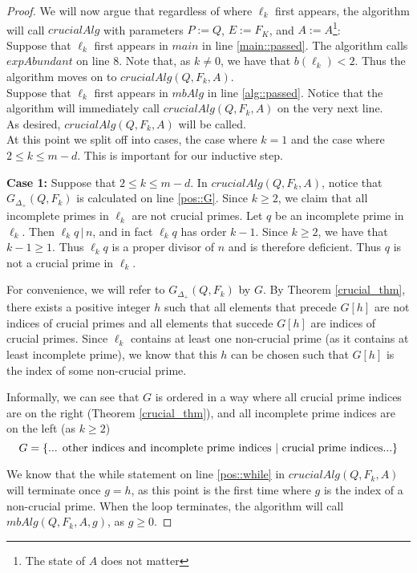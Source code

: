 \documentclass[../paper.tex]{subfiles}
\begin{document}
\begin{proof}
  We will now argue that regardless of where $\ell_k$ first
appears, the algorithm will call $crucialAlg$ with
parameters $P:= Q$, $E := F_K$, and $A := A$\footnote{The state of
$A$ does not matter}:
\\

Suppose that $\ell_k$ first appears in $main$ in line
\ref{main::passed}. The algorithm calls $expAbundant$ on 
line 8. Note that, 
as $k \neq 0$, we have that $b(\ell_k) < 2$. Thus the algorithm 
moves on to $crucialAlg(Q, F_k, A)$.
\\

Suppose that $\ell_k$ first appears in $mbAlg$ in line
\ref{alg::passed}. Notice that
the algorithm will immediately call $crucialAlg(Q, F_k, A)$ on the
very next line.
\\

As desired, $crucialAlg(Q, F_k, A)$ will be called.
\\
 
At this point we split off into cases, the case
where $k = 1$ and the case where $2 \leq k \leq m - d$. This is
important for our inductive step.

\textbf{Case 1:} Suppose that $2 \leq k \leq m - d$. In $crucialAlg(Q, F_k, A)$, notice 
that $G_{\Delta_+}(Q,F_k)$ is calculated on line \ref{pos::G}.
Since $k \geq 2$, we claim that
all incomplete primes in $\ell_k$ are not crucial primes.
Let $q$ be an incomplete prime in $\ell_k$. Then $\ell_k q \, |\, n$,
and in fact $\ell_k q$ has order $k - 1$. Since $k \geq 2$, we
have that $k - 1 \geq 1$. Thus $\ell_k q$ is a proper divisor of
$n$ and is therefore deficient. Thus $q$ is not a crucial prime in
$\ell_k$.

For convenience, we will refer to $G_{\Delta_+}(Q,F_k)$ by $G$. By 
Theorem {\ref{crucial_thm}}, there exists a positive integer $h$ such that
all elements that precede $G[h]$ are not indices of crucial primes
and all elements that succede $G[h]$ are indices of crucial
primes. Since $\ell_k$ contains at least one non-crucial prime (as
it contains at least incomplete prime), we know that this $h$ can
be chosen such that $G[h]$ is the index of some non-crucial prime.

Informally, we can see that $G$ is ordered in a way where all 
crucial prime indices are on the right (Theorem {\ref{crucial_thm}}), 
and all incomplete prime indices are on the left (as $k \geq 2$)
%
$$ G = \{ \text{... other indices and incomplete prime indices 
$ | $ crucial prime indices...} \} $$

We know that the while statement on line \ref{pos::while} in
$crucialAlg(Q, F_k, A)$ will terminate once $g = h$, as this point is the
first time where $g$ is the index of a non-crucial prime. When
the loop terminates, the algorithm will call $mbAlg(Q,F_k, A,
g)$, as $g \geq 0$. 


\end{proof}
\end{document}
